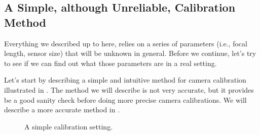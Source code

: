 \subsection{A Simple, although Unreliable, Calibration Method}
\label{sec:simple_unreliable_calibration_method}

Everything we described up to here, relies on a series of parameters (i.e., focal length, sensor size) that will be unknown in general. Before we continue, let's try to see if we can find out what those parameters are in a real setting. 

Let's start by describing a simple and intuitive method for camera calibration illustrated in \fig{\ref{fig:simple_calibration}}. The method we will describe is not very accurate, but it provides be a good sanity check before doing more precise camera calibrations. We will describe a more accurate method in \sect{\ref{sec:camera_calibration}}.


\begin{figure}[h]
\centerline{
}
\caption{A simple calibration setting.}
\label{fig:simple_calibration}
\end{figure}

